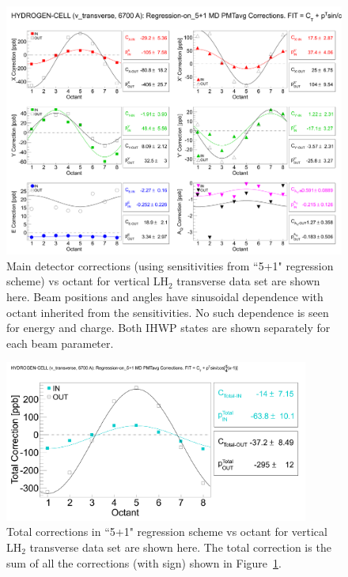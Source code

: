 \begin{figure}[!h]
	\begin{center}
	\includegraphics[width=15.0cm]{figures/MD_v_transverse_5+1_corrections}
	\end{center}
	\caption
	{Main detector corrections (using sensitivities from ``5+1" regression scheme) vs octant for vertical LH$_{2}$ transverse data set are shown here. Beam positions and angles have sinusoidal dependence with octant inherited from the sensitivities. No such dependence is seen for energy and charge. Both IHWP states are shown separately for each beam parameter.}
	\label{fig:MD_v_transverse_5+1_corrections}
\end{figure}

\begin{figure}[!h]
	\begin{center}
	\includegraphics[width=10.0cm]{figures/MD_v_transverse_5+1_TotalCorrections}
	\end{center}
	\caption
	{Total corrections in ``5+1" regression scheme vs octant for vertical LH$_{2}$ transverse data set are shown here. The total correction is the sum of all the corrections (with sign) shown in Figure~\ref{fig:MD_v_transverse_5+1_corrections}.}
	\label{fig:MD_v_transverse_5+1_TotalCorrections}
\end{figure}

